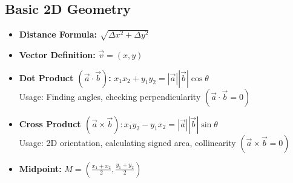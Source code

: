 \subsection{Basic 2D Geometry}

\begin{itemize}
    \item \textbf{Distance Formula: }$\sqrt{\Delta x^2 + \Delta y^2}$
    \item \textbf{Vector Definition: }$\vec{v} = (x,y)$
    \item \textbf{Dot Product $(\vec{a} \cdot \vec{b})$: }$x_1 x_2 + y_1 y_2 = |\vec{a}| |\vec{b}| \cos \theta$ \\ Usage: Finding angles, checking perpendicularity $(\vec{a} \cdot \vec{b} = 0)$
    \item \textbf{Cross Product $(\vec{a} \times \vec{b}): $}$x_1 y_2 - y_1 x_2 = |\vec{a}| |\vec{b}| \sin \theta$ \\ Usage: 2D orientation, calculating signed area, collinearity $(\vec{a} \times \vec{b} = 0)$
    \item \textbf{Midpoint: }$M = (\frac{x_1 + x_2}{2}, \frac{y_1 + y_2}{2})$
\end{itemize}